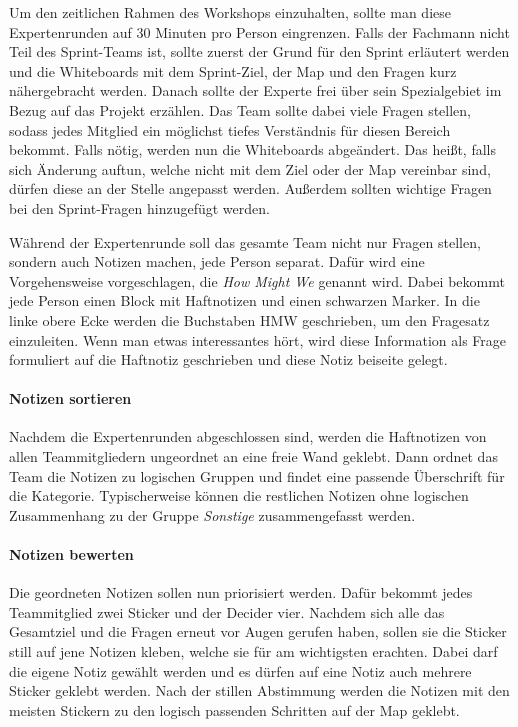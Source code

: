 Um den zeitlichen Rahmen des Workshops einzuhalten, sollte man diese Expertenrunden auf 30 Minuten pro Person eingrenzen. Falls der Fachmann nicht Teil des Sprint-Teams ist, sollte zuerst der Grund für den Sprint erläutert werden und die Whiteboards mit dem Sprint-Ziel, der Map und den Fragen kurz nähergebracht werden. Danach sollte der Experte frei über sein Spezialgebiet im Bezug auf das Projekt erzählen. Das Team sollte dabei viele Fragen stellen, sodass jedes Mitglied ein möglichst tiefes Verständnis für diesen Bereich bekommt. Falls nötig, werden nun die Whiteboards abgeändert. Das heißt, falls sich Änderung auftun, welche nicht mit dem Ziel oder der Map vereinbar sind, dürfen diese an der Stelle angepasst werden. Außerdem sollten wichtige Fragen bei den Sprint-Fragen hinzugefügt werden.

Während der Expertenrunde soll das gesamte Team nicht nur Fragen stellen, sondern auch Notizen machen, jede Person separat. Dafür wird eine Vorgehensweise vorgeschlagen, die \textit{How Might We} genannt wird. Dabei bekommt jede Person einen Block mit Haftnotizen und einen schwarzen Marker. In die linke obere Ecke werden die Buchstaben HMW geschrieben, um den Fragesatz einzuleiten. Wenn man etwas interessantes hört, wird diese Information als Frage formuliert auf die Haftnotiz geschrieben und diese Notiz beiseite gelegt.

\paragraph{Notizen sortieren}
Nachdem die Expertenrunden abgeschlossen sind, werden die Haftnotizen von allen Teammitgliedern ungeordnet an eine freie Wand geklebt. Dann ordnet das Team die Notizen zu logischen Gruppen und findet eine passende Überschrift für die Kategorie. Typischerweise können die restlichen Notizen ohne logischen Zusammenhang zu der Gruppe \textit{Sonstige} zusammengefasst werden.

\paragraph{Notizen bewerten}
Die geordneten Notizen sollen nun priorisiert werden. Dafür bekommt jedes Teammitglied zwei Sticker und der Decider vier. Nachdem sich alle das Gesamtziel und die Fragen erneut vor Augen gerufen haben, sollen sie die Sticker still auf jene Notizen kleben, welche sie für am wichtigsten erachten. Dabei darf die eigene Notiz gewählt werden und es dürfen auf eine Notiz auch mehrere Sticker geklebt werden. Nach der stillen Abstimmung werden die Notizen mit den meisten Stickern zu den logisch passenden Schritten auf der Map geklebt.


